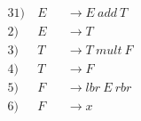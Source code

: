 \begin{alignat*}{3}
1) \ & E &&\rightarrow E\ add\ T \\
2) \ & E &&\rightarrow T \\
3) \ & T &&\rightarrow T\ mult\ F \\
4) \ & T &&\rightarrow F \\
5) \ & F &&\rightarrow lbr\ E\ rbr \\
6) \ & F &&\rightarrow x \\
\end{alignat*}